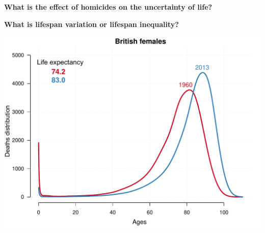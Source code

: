 \documentclass[xcolor={dvipsnames}]{beamer}
\begin{document}
\begin{frame}
	\huge{
		\begin{center}
		
		\textbf{What is the effect of homicides on the uncertainty of life?}
		
		\end{center}		

	}
\end{frame}

\begin{frame}
	\begin{center}
		\Large{\textbf{What is lifespan variation or lifespan inequality?}}
	\end{center}


	\begin{center}
		\includegraphics[scale=.49]{Figures/DistribGBR1}
	\end{center}
	
\end{frame}
\end{document}
